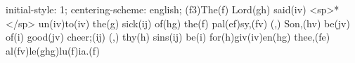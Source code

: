 initial-style: 1;
centering-scheme: english;
(f3)The(f) Lord(gh) said(iv) <sp>*</sp> un(iv)to(iv) the(g) sick(ij) of(hg) the(f) pal(ef)sy,(fv) (,) Son,(hv) be(jv) of(i) good(jv) cheer;(ij) (,) thy(h) sins(ij) be(i) for(h)giv(iv)en(hg) thee,(fe) al(fv)le(ghg)lu(f)ia.(f)
